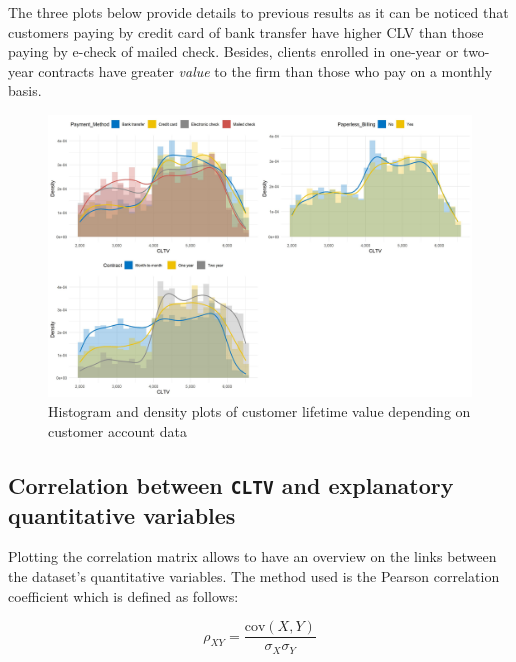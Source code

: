 \documentclass[
]{book}
\begin{document}
The three plots below provide details to previous results as it can be noticed that customers paying by credit card of bank transfer have higher CLV than those paying by e-check of mailed check. Besides, clients enrolled in one-year or two-year contracts have greater \emph{value} to the firm than those who pay on a monthly basis.

\begin{figure}

{\centering \includegraphics[width=50in]{./imgs/cltv_account_info_plots} 

}

\caption{Histogram and density plots of customer lifetime value depending on customer account data}\label{fig:cltvaccountinfo}
\end{figure}

\hypertarget{correlation-between-cltv-and-explanatory-quantitative-variables}{%
\subsection*{\texorpdfstring{Correlation between \texttt{CLTV} and explanatory quantitative variables}{Correlation between CLTV and explanatory quantitative variables}}\label{correlation-between-cltv-and-explanatory-quantitative-variables}}

Plotting the correlation matrix allows to have an overview on the links between the dataset's quantitative variables. The method used is the Pearson correlation coefficient which is defined as follows:

\begin{equation}
  \rho_{XY} = \frac{\text{cov}(X, Y)}{\sigma_X \sigma_Y}
  \label{eq:pearson}
\end{equation}
\end{document}

